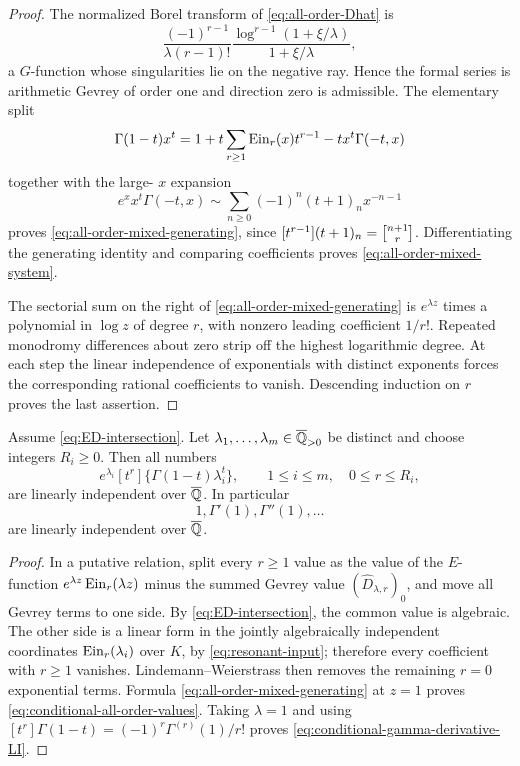 \begin{proof}
The normalized Borel transform of \eqref{eq:all-order-Dhat} is
\[
 \frac{(-1)^{r-1}}{\lambda(r-1)!}
 \frac{\log^{r-1}(1+\xi/\lambda)}{1+\xi/\lambda},
\]
a \(G\)-function whose singularities lie on the negative ray.  Hence the
formal series is arithmetic Gevrey of order one and direction zero is
admissible.  The elementary split
\[
 \Gamma(1-t)x^t
 =1+t\sum_{r\ge1}\operatorname{Ein}_r(x)t^{r-1}
   -t x^t\Gamma(-t,x)
\]
together with the large-
\(x\) expansion
\[
 e^x x^t\Gamma(-t,x)
 \sim\sum_{n\ge0}(-1)^n(t+1)_n x^{-n-1}
\]
proves \eqref{eq:all-order-mixed-generating}, since
\([t^{r-1}](t+1)_n=\stirling{n+1}{r}\).  Differentiating the generating
identity and comparing coefficients proves
\eqref{eq:all-order-mixed-system}.

The sectorial sum on the right of
\eqref{eq:all-order-mixed-generating} is \(e^{\lambda z}\) times a
polynomial in \(\log z\) of degree \(r\), with nonzero leading coefficient
\(1/r!\).  Repeated monodromy differences about zero strip off the highest
logarithmic degree.  At each step the linear independence of exponentials
with distinct exponents forces the corresponding rational coefficients to
vanish.  Descending induction on \(r\) proves the last assertion.
\end{proof}

\begin{theorem}
\label{thm:conditional-all-order-gamma}
Assume \eqref{eq:ED-intersection}.  Let
\(\lambda_1,\ldots,\lambda_m\in\overline{\mathbb Q}_{>0}\) be distinct and choose
integers \(R_i\ge0\).  Then all numbers
\begin{equation}\label{eq:conditional-all-order-values}
 \boxed{\displaystyle
 e^{\lambda_i}[t^r]\{\Gamma(1-t)\lambda_i^t\},
 \qquad 1\le i\le m,\quad0\le r\le R_i,}
\end{equation}
are linearly independent over \(\overline{\mathbb Q}\).  In particular
\begin{equation}\label{eq:conditional-gamma-derivative-LI}
 \boxed{1,\Gamma'(1),\Gamma''(1),\ldots}
\end{equation}
are linearly independent over \(\overline{\mathbb Q}\).
\end{theorem}

\begin{proof}
In a putative relation, split every \(r\ge1\) value as the value of the
\(E\)-function \(e^{\lambda z}\operatorname{Ein}_r(\lambda z)\) minus the summed
Gevrey value \((\widehat D_{\lambda,r})_0\), and move all Gevrey terms to
one side.  By \eqref{eq:ED-intersection}, the common value is algebraic.
The other side is a linear form in the jointly algebraically independent
coordinates \(\operatorname{Ein}_r(\lambda_i)\) over \(K\), by
\eqref{eq:resonant-input}; therefore every coefficient with \(r\ge1\)
vanishes.  Lindemann--Weierstrass then removes the remaining \(r=0\)
exponential terms.  Formula \eqref{eq:all-order-mixed-generating} at
\(z=1\) proves \eqref{eq:conditional-all-order-values}.  Taking
\(\lambda=1\) and using
\([t^r]\Gamma(1-t)=(-1)^r\Gamma^{(r)}(1)/r!\) proves
\eqref{eq:conditional-gamma-derivative-LI}.
\end{proof}

